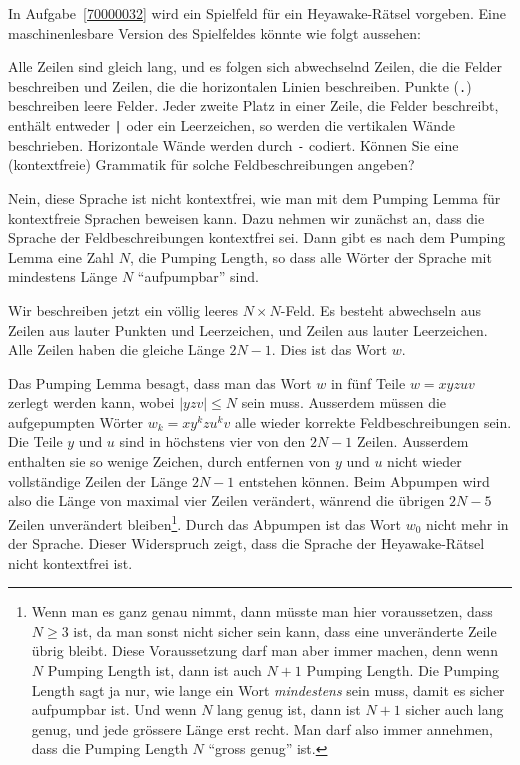 In Aufgabe~\ref{70000032} wird ein Spielfeld für ein Heyawake-Rätsel vorgeben.
Eine maschinenlesbare Version des Spielfeldes könnte wie 
folgt aussehen:
\begin{center}
\small
{}
\end{center}
Alle Zeilen sind gleich lang, und es folgen sich abwechselnd Zeilen,
die die Felder beschreiben und Zeilen, die die horizontalen Linien
beschreiben.
Punkte (\texttt{.}) beschreiben leere Felder.
Jeder zweite Platz in einer Zeile, die Felder beschreibt,
enthält entweder \texttt{|} oder ein Leerzeichen, so werden die
vertikalen Wände beschrieben.
Horizontale Wände werden durch \texttt{-} codiert.
Können Sie eine (kontextfreie) Grammatik für solche Feldbeschreibungen
angeben?

\begin{loesung}
Nein, diese Sprache ist nicht kontextfrei, wie man mit dem 
Pumping Lemma für kontextfreie Sprachen beweisen kann.
Dazu nehmen wir zunächst an, dass die Sprache der Feldbeschreibungen
kontextfrei sei. Dann gibt es nach dem Pumping Lemma eine Zahl $N$,
die Pumping Length, so dass alle Wörter der Sprache mit mindestens
Länge $N$ ``aufpumpbar'' sind.

Wir beschreiben jetzt ein völlig leeres $N\times N$-Feld. Es besteht
abwechseln aus Zeilen aus lauter Punkten und Leerzeichen, und Zeilen
aus lauter Leerzeichen. Alle Zeilen haben die gleiche Länge $2N-1$.
Dies ist das Wort $w$.

Das Pumping Lemma besagt, dass man das Wort  $w$ in fünf Teile
$w=xyzuv$ zerlegt werden kann, wobei $|yzv|\le N$ sein muss.
Ausserdem müssen die aufgepumpten Wörter $w_k=xy^kzu^kv$ alle wieder
korrekte Feldbeschreibungen sein.
Die Teile $y$ und $u$ sind in höchstens vier von den $2N-1$ Zeilen.
Ausserdem enthalten sie so wenige Zeichen, durch entfernen von
$y$ und $u$ nicht wieder vollständige Zeilen der Länge $2N-1$ entstehen
können.
Beim Abpumpen wird also die Länge von maximal vier Zeilen verändert,
wänrend die übrigen $2N-5$ Zeilen unverändert bleiben\footnote{Wenn man
es ganz genau nimmt, dann müsste man hier voraussetzen, dass $N \ge 3$ ist,
da man sonst nicht sicher sein kann, dass eine unveränderte Zeile
übrig bleibt. Diese Voraussetzung darf man aber immer machen, denn
wenn $N$ Pumping Length ist, dann ist auch $N+1$ Pumping Length.
Die Pumping Length sagt ja nur, wie lange ein Wort {\em mindestens} sein
muss, damit es sicher aufpumpbar ist. Und wenn $N$ lang genug ist, dann ist
$N+1$ sicher auch lang genug, und jede grössere Länge erst recht.
Man darf also immer annehmen, dass die Pumping Length $N$ ``gross genug'' ist.}.
Durch das Abpumpen ist das Wort $w_0$ nicht mehr in der Sprache.
Dieser Widerspruch zeigt, dass die Sprache der Heyawake-Rätsel nicht
kontextfrei ist.
\end{loesung}

